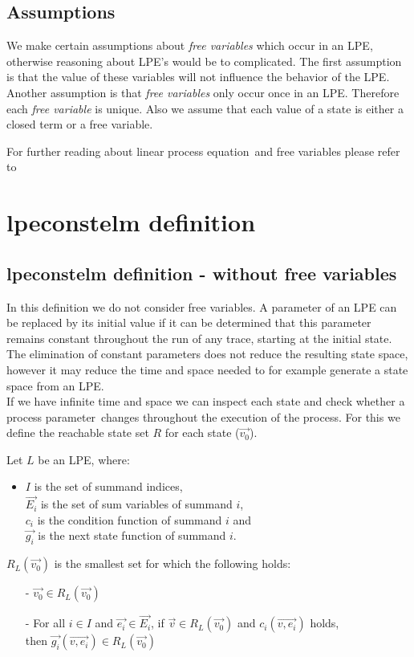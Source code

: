 \index{}\documentclass[a4paper,10pt]{article}
\theoremstyle{plain}
\theoremstyle{definition}
\newcommand{\lpe}{linear process equation}
\newcommand{\ovr}{\overrightarrow}
\newcommand{\pp}{process parameter}
\newcommand{\ti}{\textit}
\begin{document}
\subsection{Assumptions}
We make certain assumptions about \ti{free variables} which occur in an LPE, otherwise reasoning about LPE's would be to complicated. The first assumption is that the value of these variables will not influence the behavior of the LPE. Another assumption is that \ti{free variables} only occur once in an LPE. Therefore each \ti{free variable} is unique.
Also we assume that each value of a state is either a closed term or a free variable. 
 
For further reading about \lpe\ and free variables please refer to \cite{LPEfreevar} 

\section{lpeconstelm definition}\label{subsec:lpedef}
\subsection{lpeconstelm definition - without free variables}

In this definition we do not consider free variables.
A parameter of an LPE can be replaced by its initial value if it can be determined that this parameter remains constant throughout the run of any trace, starting at the initial state. The elimination of constant parameters does not reduce the resulting state space, however it may reduce the time and space needed to for example generate a state space from an LPE. \\
If we have infinite time and space we can inspect each state and check whether a \pp\ changes throughout the execution of the process. For this we define the reachable state set $R$ for each state ($\ovr{v_0}$). 

\begin{defn} Let $L$ be an LPE, where: \\ 
\begin{itemize}
\item $I$ is the set of summand indices, \\ $\ovr{E_i}$ is the set of sum variables of summand $i$, \\ $c_i$ is the condition function of summand $i$ and \\ $\ovr{g_i}$ is the next state function of summand $i$.
\end{itemize}

$R_L(\ovr{v_0})$ is the smallest set for which the following holds:
  \begin{itemize}
    \item[-] $\ovr{v_0} \in R_L(\ovr{v_0})$
    \item[-] For all $i \in I$ and $\ovr{e_i} \in \ovr{E_i}$, if $\ovr{v} \in R_L(\ovr{v_0})$ and $c_i(\ovr{v, e_i})$ holds, \\ then $\ovr{g_i}(\ovr{v, e_i}) \in R_L(\ovr{v_0})$ \\
   \end{itemize}
\end{defn}
\end{document}
